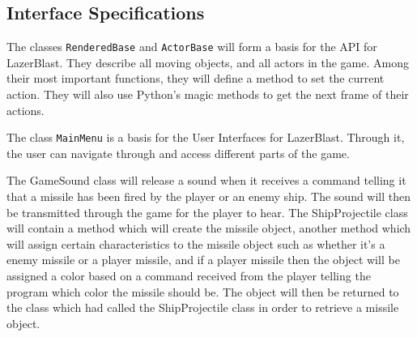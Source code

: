 %
\subsection*{Interface Specifications}
    The classes \texttt{RenderedBase} and
    \texttt{ActorBase} will form a basis for
    the API for LazerBlast.  They describe all moving
    objects, and all actors in the game.  Among their
    most important functions, they will define a method
    to set the current action.  They will also use Python's
    magic methods to get the next frame of their actions.

    The class \texttt{MainMenu} is a basis for the User
    Interfaces for LazerBlast. Through it, the user can navigate
    through and access different parts of the game.

    The GameSound class will release a sound when it receives
    a command telling it that a missile has been fired by
    the player or an enemy ship.  The sound will then be transmitted
    through the game for the player to hear.  The ShipProjectile
    class will contain a method which will create the missile
    object, another method which will assign certain characteristics
    to the missile object such as whether it’s a enemy missile or a
    player missile, and if a player missile then the object will be
    assigned a color based on a command received from the player
    telling the program which color the missile should be. The
    object will then be returned to the class which had called the
    ShipProjectile class in order to retrieve a missile object.

